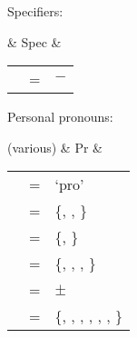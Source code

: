 \a Specifiers:\medskip

	\begin{tabu} {}
		& Spec
		& \begin{tabular}[t]{l c l}
			\ups{\Spec} & = & $-$ \\
		\end{tabular}
	\end{tabu}
	
\a Personal pronouns:\medskip

	\begin{tabu} {}
	(various)
		& Pr
		& \begin{tabular}[t]{l c l}
			\ups{\Pred} & = & `pro' \\
			\ups{\Pers} & = & \{\First{}, \Second{}, \Third{}\} \\
			\ups{\Num} & = & \{\Sg{}, \Pl{}\} \\
			\ups{\Gend} & = & \{\M{}, \F{}, \N{}, \nul{}\} \\
			\ups{\Anim} & = & $\pm$ \\
			\ups{\Case} & = & \{\Aarg{}, \Parg{}, \Dat{}, \Gen{}, 
				\Loc{}, \Ins{}, \Caus{}\} \\
		\end{tabular}
	\end{tabu}
\xe

%
%
%
%
